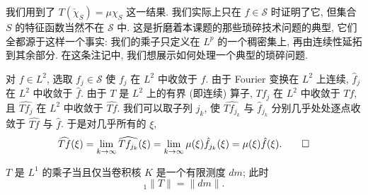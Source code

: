 \begin{remark}\label{rem:1.6}
我们用到了 $T(\check{\chi}_S)=\mu\chi_S$ 这一结果. 我们实际上只在 $f\in\mathcal{S}$ 时证明了它, 但集合 $S$ 的特征函数当然不在 $\mathcal{S}$ 中. 这是折磨着本课题的那些琐碎技术问题的典型, 它们全都源于这样一个事实: 我们的乘子只定义在 $L^p$ 的一个稠密集上, 再由连续性延拓到其余部分. 在这条注记中, 我们想展示如何处理一个典型的琐碎问题.

对 $f\in L^2$, 选取 $f_j\in\mathcal{S}$ 使 $f_j$ 在 $L^2$ 中收敛于 $f$. 由于 Fourier 变换在 $L^2$ 上连续, $\hat{f}_j$ 在 $L^2$ 中收敛于 $\hat{f}$. 由于 $T$ 是 $L^2$ 上的有界 (即连续) 算子, $Tf_j$ 在 $L^2$ 中收敛于 $Tf$, 且 $\widehat{Tf_j}$ 在 $L^2$ 中收敛于 $\widehat{Tf}$. 我们可以取子列 $j_k$, 使 $\widehat{Tf_{j_k}}$ 与 $\hat{f}_{j_k}$ 分别几乎处处逐点收敛于 $\widehat{Tf}$ 与 $\hat{f}$. 于是对几乎所有的 $\xi$,
\[
\widehat{Tf}(\xi)=\lim_{k\to\infty}\widehat{Tf_{j_k}}(\xi)
=\lim_{k\to\infty}\mu(\xi)\hat{f}_{j_k}(\xi)=\mu(\xi)\hat{f}(\xi). \qedhere
\]
\end{remark}

\begin{proposition}\label{prop:1.7}
$T$ 是 $L^1$ 的乘子当且仅当卷积核 $K$ 是一个有限测度 $dm$; 此时
\[
{}_1\|T\|=\|dm\|.
\]
\end{proposition}

